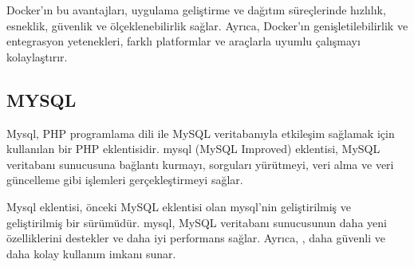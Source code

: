 Docker'ın bu avantajları, uygulama geliştirme ve dağıtım süreçlerinde hızlılık, esneklik, güvenlik ve ölçeklenebilirlik sağlar. Ayrıca, Docker'ın genişletilebilirlik ve entegrasyon yetenekleri, farklı platformlar ve araçlarla uyumlu çalışmayı kolaylaştırır.
\subsection{MYSQL}
Mysql, PHP programlama dili ile MySQL veritabanıyla etkileşim sağlamak için kullanılan bir PHP eklentisidir. mysql (MySQL Improved) eklentisi, MySQL veritabanı sunucusuna bağlantı kurmayı, sorguları yürütmeyi, veri alma ve veri güncelleme gibi işlemleri gerçekleştirmeyi sağlar.

Mysql  eklentisi, önceki MySQL eklentisi olan mysql'nin geliştirilmiş ve geliştirilmiş bir sürümüdür. mysql, MySQL veritabanı sunucusunun daha yeni özelliklerini destekler ve daha iyi performans sağlar. Ayrıca, , daha güvenli ve daha kolay kullanım imkanı sunar.

